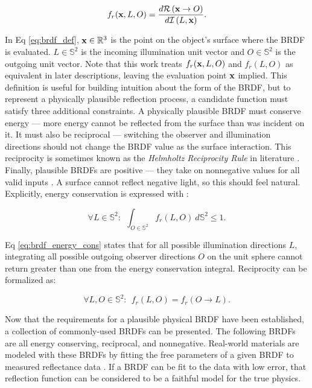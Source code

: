\begin{equation} \label{eq:brdf_def}
    f_r(\mathbf{x}, L, O) = \frac{d\mathcal{R}\left(\mathbf{x} \rightarrow O\right)}{d\mathcal{I}\left(L, \mathbf{x}\right)}.
\end{equation}

In Eq \ref{eq:brdf_def}, $\mathbf{x} \in \mathbb{R}^3$ is the point on the object's surface where the BRDF is evaluated. $L \in \mathbb{S}^2$ is the incoming illumination unit vector and $O \in \mathbb{S}^2$ is the outgoing unit vector. Note that this work treats $f_r(\mathbf{x}, L, O)$ and $f_r(L, O)$ as equivalent in later descriptions, leaving the evaluation point $\mathbf{x}$ implied. This definition is useful for building intuition about the form of the BRDF, but to represent a physically plausible reflection process, a candidate function must satisfy three additional constraints. A physically plausible BRDF must conserve energy --- more energy cannot be reflected from the surface than was incident on it. It must also be reciprocal --- switching the observer and illumination directions should not change the BRDF value as the surface interaction. This reciprocity is sometimes known as the \textit{Helmholtz Reciprocity Rule} in literature \cite{montes2012}. Finally, plausible BRDFs are positive --- they take on nonnegative values for all valid inputs \cite{montes2012}. A surface cannot reflect negative light, so this should feel natural. Explicitly, energy conservation is expressed with \cite{montes2012}:

\begin{equation} \label{eq:brdf_energy_cons}
  \forall L \in \mathbb{S}^2 : \:\: \int_{O \in \mathbb{S}^2} f_r(L, O) \: d\mathbb{S}^2 \leq 1.
\end{equation}

Eq \ref{eq:brdf_energy_cons} states that for all possible illumination directions $L$, integrating all possible outgoing observer directions $O$ on the unit sphere cannot return greater than one from the energy conservation integral. Reciprocity can be formalized as:

\begin{equation} \label{eq:brdf_reciprocity}
  \forall L, O \in \mathbb{S}^2 : \:\: f_r(L, O) = f_r(O \rightarrow L).
\end{equation}

Now that the requirements for a plausible physical BRDF have been established, a collection of commonly-used BRDFs can be presented. The following BRDFs are all energy conserving, reciprocal, and nonnegative. Real-world materials are modeled with these BRDFs by fitting the free parameters of a given BRDF to measured reflectance data \cite{matusik2003}. If a BRDF can be fit to the data with low error, that reflection function can be considered to be a faithful model for the true physics. 

